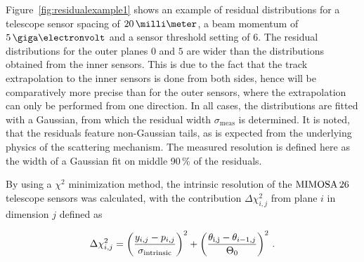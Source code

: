 Figure~\ref{fig:residualexample1} shows an example of residual distributions for a telescope sensor spacing of $20\,\milli\meter$,
 a beam momentum of $5\,\giga\electronvolt$ and a sensor threshold setting of $6$.
The residual distributions for the outer planes $0$ and $5$ are wider than the distributions obtained from the inner sensors.
This is due to the fact that the track extrapolation to the inner sensors is done from both sides, hence will be comparatively more precise than for the outer sensors,
 where the extrapolation can only be performed from one direction. 
In all cases, the distributions are fitted with a Gaussian, from which the residual width $\sigma_{\textrm{meas}}$ is determined.
It is noted, that the residuals feature non-Gaussian tails, as is expected from the underlying physics of the scattering mechanism. 
The measured resolution is defined here as the width of a Gaussian fit on middle 90\,\% of the residuals. 



% 

By using a $\chi^{2}$ minimization method, the intrinsic resolution of the $\textrm{MIMOSA\,26}$ telescope sensors was calculated, with the contribution $\Delta \chi^2_{i,j}$ from plane $i$ in dimension $j$ defined as

\begin{equation}
\Delta \chi^2_{i,j} = \left( \frac{y_{i,j} - p_{i,j}}{\sigma_{\textrm{intrinsic}}} \right)^2 +
\left( \frac{\theta_{\textrm{i,j}} - \theta_{i-1,j}}{\Theta_{0}} \right)^2 \,.
\end{equation}

